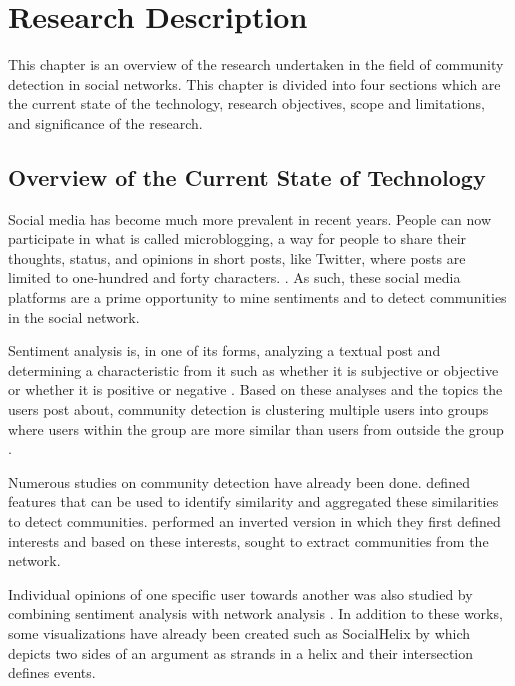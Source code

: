 %
%
%                 

\chapter{Research Description}
\label{sec:researchdesc}

This chapter is an overview of the research undertaken in the field of community detection in social networks. 
This chapter is divided into four sections which are the current state of the technology, research objectives, scope and limitations, and significance of the research.

\section{Overview of the Current State of Technology}
\label{sec:overview}

Social media has become much more prevalent in recent years. People can now participate in what is called microblogging, a way for people to share their thoughts, status, and opinions in short posts, like Twitter, where posts are limited to one-hundred and forty characters. \cite{Java:2007}. As such, these social media platforms are a prime opportunity to mine sentiments and to detect communities in the social network. 

Sentiment analysis is, in one of its forms, analyzing a textual post and determining a characteristic from it such as whether it is subjective or objective or whether it is positive or negative \cite{Deitrick:2013}. Based on these analyses and the topics the users post about, community detection is clustering multiple users into groups where users within the group are more similar than users from outside the group \cite{Tang:2010}.

Numerous studies on community detection have already been done.  defined features that can be used to identify similarity and aggregated these similarities to detect communities.  performed an inverted version in which they first defined interests and based on these interests, sought to extract communities from the network. 

Individual opinions of one specific user towards another was also studied by combining sentiment analysis with network analysis \cite{West:2014}. In addition to these works, some visualizations have already been created such as SocialHelix by  which depicts two sides of an argument as strands in a helix and their intersection defines events.

